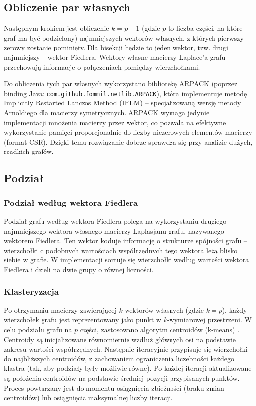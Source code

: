 \documentclass{article}
\begin{document}
    

    \subsection{Obliczenie par własnych}

    Następnym krokiem jest obliczenie \(k = p - 1\) (gdzie \(p\) to liczba części, na które graf ma być podzielony) najmniejszych wektorów własnych, z których pierwszy zerowy zostanie pominięty. Dla bisekcji będzie to jeden wektor, tzw. drugi najmniejszy – wektor Fiedlera. Wektory własne macierzy Laplace'a grafu przechowują informacje o połączeniach pomiędzy wierzchołkami.
    
    Do obliczenia tych par własnych wykorzystano bibliotekę ARPACK (poprzez binding Java: \texttt{com.github.fommil.netlib.ARPACK}), która implementuje metodę Implicitly Restarted Lanczos Method (IRLM) – specjalizowaną wersję metody Arnoldiego dla macierzy symetrycznych. ARPACK wymaga jedynie implementacji mnożenia macierzy przez wektor, co pozwala na efektywne wykorzystanie pamięci proporcjonalnie do liczby niezerowych elementów macierzy (format CSR). Dzięki temu rozwiązanie dobrze sprawdza się przy analizie dużych, rzadkich grafów.



    \subsection{Podział}

    \subsubsection{Podział według wektora Fiedlera}
    
    Podział grafu według wektora Fiedlera polega na wykorzystaniu drugiego najmniejszego wektora własnego macierzy Laplasjanu grafu, nazywanego wektorem Fiedlera. Ten wektor koduje informację o strukturze spójności grafu – wierzchołki o podobnych wartościach współrzędnych tego wektora leżą blisko siebie w grafie. W implementacji sortuje się wierzchołki według wartości wektora Fiedlera i dzieli na dwie grupy o równej liczności.
    
    \subsubsection{Klasteryzacja}
    Po otrzymaniu macierzy zawierającej \(k\) wektorów własnych (gdzie \(k = p\)), każdy wierzchołek grafu jest reprezentowany jako punkt w \(k\)-wymiarowej przestrzeni. W celu podziału grafu na \(p\) części, zastosowano algorytm centroidów (k-means) \cite{k-means}. Centroidy są inicjalizowane równomiernie wzdłuż głównych osi na podstawie zakresu wartości współrzędnych. Następnie iteracyjnie przypisuje się wierzchołki do najbliższych centroidów, z zachowaniem ograniczenia liczebności każdego klastra (tak, aby podziały były możliwie równe). Po każdej iteracji aktualizowane są położenia centroidów na podstawie średniej pozycji przypisanych punktów. Proces powtarzany jest do momentu osiągnięcia zbieżności (braku zmian centroidów) lub osiągnięcia maksymalnej liczby iteracji.
\end{document}
